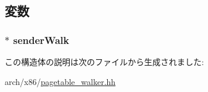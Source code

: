 \begin{DoxyCode}
161                                                          :
162                 senderWalk(_senderWalk) {}
        };
\end{DoxyCode}


\subsection{変数}
\hypertarget{structX86ISA_1_1Walker_1_1WalkerSenderState_a36cdab45ce488c7978f72c6b8cc1d2ad}{
\subsubsection[{senderWalk}]{$\ast$ {\bf senderWalk}}}
\label{structX86ISA_1_1Walker_1_1WalkerSenderState_a36cdab45ce488c7978f72c6b8cc1d2ad}


この構造体の説明は次のファイルから生成されました:\begin{DoxyCompactItemize}
\item 
arch/x86/\hyperlink{pagetable__walker_8hh}{pagetable\_\-walker.hh}\end{DoxyCompactItemize}
